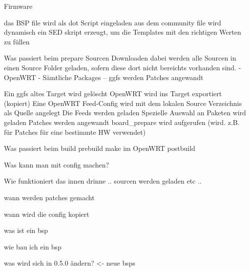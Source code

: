 \begin{frame}{Firmware}

    das BSP file wird als dot Script eingeladen
    aus dem community file wird dynamisch ein SED skript erzeugt, um die Templates mit den richtigen Werten zu füllen

    Was passiert beim prepare
        Sourcen Downloaden
        dabei werden alle Sourcen in einen Source Folder geladen, sofern diese dort nicht bereichts vorhanden sind.
        - OpenWRT
        - Sämtliche Packages
        -- ggfs werden Patches angewandt
        
        Ein ggfs altes Target wird gelöscht
        OpenWRT wird ins Target exportiert (kopiert)
        Eine OpenWRT Feed-Config wird mit dem lokalen Source Verzeichnis als Quelle angelegt
        Die Feeds werden geladen
        Spezielle Auswahl an Paketen wird geladen
        Patches werden angewandt
        board\_prepare wird aufgerufen (wird. z.B. für Patches für eine bestimmte HW verwendet)

    Was passiert beim build
        prebuild
        make im OpenWRT
        postbuild
        

    Was kann man mit config machen?

\end{frame}

Wie funktioniert das innen drinne .. sourcen werden geladen etc ..

wann werden patches gemacht

wann wird die config kopiert

was ist ein bsp

wie bau ich ein bsp

was wird sich in 0.5.0 ändern? <- neue bsps
